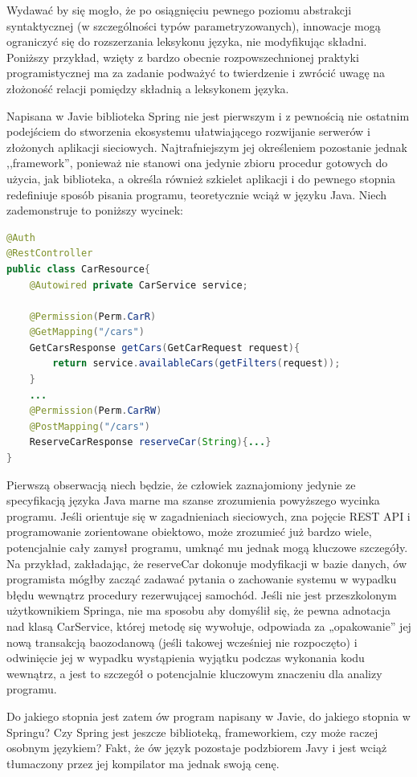 Wydawać by się mogło, że po osiągnięciu pewnego poziomu abstrakcji syntaktycznej (w szczególności typów parametryzowanych), innowacje mogą ograniczyć się do rozszerzania leksykonu języka, nie modyfikując składni. Poniższy przykład, wzięty z bardzo obecnie rozpowszechnionej praktyki programistycznej ma za zadanie podważyć to twierdzenie i zwrócić uwagę na złożoność relacji pomiędzy składnią a leksykonem języka.

Napisana w Javie biblioteka Spring nie jest pierwszym i z pewnością nie ostatnim podejściem do stworzenia ekosystemu ułatwiającego rozwijanie serwerów i złożonych aplikacji sieciowych. Najtrafniejszym jej określeniem pozostanie jednak ,,framework'', ponieważ nie stanowi ona jedynie zbioru procedur gotowych do użycia, jak biblioteka, a określa również szkielet aplikacji i do pewnego stopnia redefiniuje sposób pisania programu, teoretycznie wciąż w języku Java. Niech zademonstruje to poniższy wycinek:
\begin{lstlisting}[language=java]
@Auth
@RestController
public class CarResource{
    @Autowired private CarService service;

    @Permission(Perm.CarR)
    @GetMapping("/cars")
    GetCarsResponse getCars(GetCarRequest request){
        return service.availableCars(getFilters(request));
    }
    ...
    @Permission(Perm.CarRW)
    @PostMapping("/cars")
    ReserveCarResponse reserveCar(String){...}
}
\end{lstlisting}
Pierwszą obserwacją niech będzie, że człowiek zaznajomiony jedynie ze specyfikacją języka Java marne ma szanse zrozumienia powyższego wycinka programu. Jeśli orientuje się w zagadnieniach sieciowych, zna pojęcie REST API i programowanie zorientowane obiektowo, może zrozumieć już bardzo wiele, potencjalnie cały zamysł programu, umknąć mu jednak mogą kluczowe szczegóły. Na przykład, zakładając, że reserveCar dokonuje modyfikacji w bazie danych, ów programista mógłby zacząć zadawać pytania o zachowanie systemu w wypadku błędu wewnątrz procedury rezerwującej samochód. Jeśli nie jest przeszkolonym użytkownikiem Springa, nie ma sposobu aby domyślił się, że pewna adnotacja nad klasą CarService, której metodę się wywołuje, odpowiada za „opakowanie” jej nową transakcją baozodanową (jeśli takowej wcześniej nie rozpoczęto) i odwinięcie jej w wypadku wystąpienia wyjątku podczas wykonania kodu wewnątrz, a jest to szczegół o potencjalnie kluczowym znaczeniu dla analizy programu.

Do jakiego stopnia jest zatem ów program napisany w Javie, do jakiego stopnia w Springu? Czy Spring jest jeszcze biblioteką, frameworkiem, czy może raczej osobnym językiem? Fakt, że ów język pozostaje podzbiorem Javy i jest wciąż tłumaczony przez jej kompilator ma jednak swoją cenę. 


